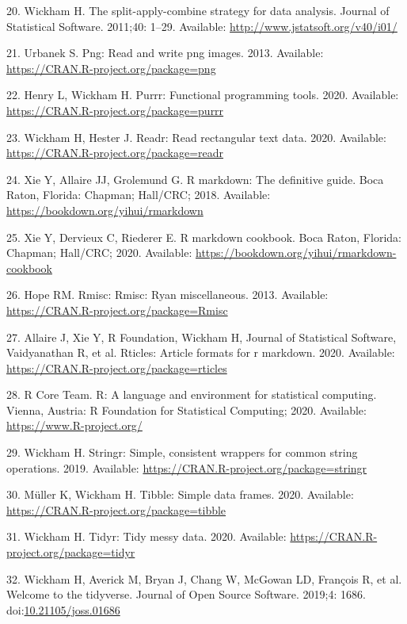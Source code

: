 \documentclass[10pt,letterpaper]{article}
\begin{document}
\leavevmode\hypertarget{ref-R-plyr}{}%
20. Wickham H. The split-apply-combine strategy for data analysis.
Journal of Statistical Software. 2011;40: 1--29. Available:
\url{http://www.jstatsoft.org/v40/i01/}

\leavevmode\hypertarget{ref-R-png}{}%
21. Urbanek S. Png: Read and write png images. 2013. Available:
\url{https://CRAN.R-project.org/package=png}

\leavevmode\hypertarget{ref-R-purrr}{}%
22. Henry L, Wickham H. Purrr: Functional programming tools. 2020.
Available: \url{https://CRAN.R-project.org/package=purrr}

\leavevmode\hypertarget{ref-R-readr}{}%
23. Wickham H, Hester J. Readr: Read rectangular text data. 2020.
Available: \url{https://CRAN.R-project.org/package=readr}

\leavevmode\hypertarget{ref-R-rmarkdown_a}{}%
24. Xie Y, Allaire JJ, Grolemund G. R markdown: The definitive guide.
Boca Raton, Florida: Chapman; Hall/CRC; 2018. Available:
\url{https://bookdown.org/yihui/rmarkdown}

\leavevmode\hypertarget{ref-R-rmarkdown_b}{}%
25. Xie Y, Dervieux C, Riederer E. R markdown cookbook. Boca Raton,
Florida: Chapman; Hall/CRC; 2020. Available:
\url{https://bookdown.org/yihui/rmarkdown-cookbook}

\leavevmode\hypertarget{ref-R-Rmisc}{}%
26. Hope RM. Rmisc: Rmisc: Ryan miscellaneous. 2013. Available:
\url{https://CRAN.R-project.org/package=Rmisc}

\leavevmode\hypertarget{ref-R-rticles}{}%
27. Allaire J, Xie Y, R Foundation, Wickham H, Journal of Statistical
Software, Vaidyanathan R, et al. Rticles: Article formats for r
markdown. 2020. Available:
\url{https://CRAN.R-project.org/package=rticles}

\leavevmode\hypertarget{ref-R-splines}{}%
28. R Core Team. R: A language and environment for statistical
computing. Vienna, Austria: R Foundation for Statistical Computing;
2020. Available: \url{https://www.R-project.org/}

\leavevmode\hypertarget{ref-R-stringr}{}%
29. Wickham H. Stringr: Simple, consistent wrappers for common string
operations. 2019. Available:
\url{https://CRAN.R-project.org/package=stringr}

\leavevmode\hypertarget{ref-R-tibble}{}%
30. Müller K, Wickham H. Tibble: Simple data frames. 2020. Available:
\url{https://CRAN.R-project.org/package=tibble}

\leavevmode\hypertarget{ref-R-tidyr}{}%
31. Wickham H. Tidyr: Tidy messy data. 2020. Available:
\url{https://CRAN.R-project.org/package=tidyr}

\leavevmode\hypertarget{ref-R-tidyverse}{}%
32. Wickham H, Averick M, Bryan J, Chang W, McGowan LD, François R, et
al. Welcome to the tidyverse. Journal of Open Source Software. 2019;4:
1686.
doi:\href{https://doi.org/10.21105/joss.01686}{10.21105/joss.01686}

\endgroup

\nolinenumbers
\end{document}
